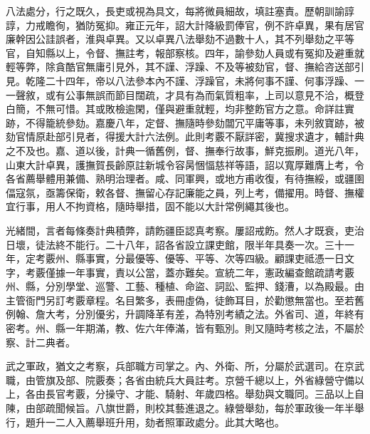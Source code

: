 \begin{pinyinscope}
八法處分，行之既久，長吏或視為具文，每將微員細故，填註塞責。歷朝訓諭諄諄，力戒瞻徇，猶防冤抑。雍正元年，詔大計降級罰俸官，例不許卓異，果有居官廉幹因公詿誤者，淮與卓異。又以卓異八法舉劾不過數十人，其不列舉劾之平等官，自知縣以上，令督、撫註考，報部察核。四年，諭參劾人員或有冤抑及避重就輕等弊，除貪酷官無庸引見外，其不謹、浮躁、不及等被劾官，督、撫給咨送部引見。乾隆二十四年，帝以八法參本內不謹、浮躁官，未將何事不謹、何事浮躁、一一聲敘，或有公事無誤而節目闊疏，才具有為而氣質粗率，上司以意見不洽，概登白簡，不無可惜。其或敗檢逾閑，僅與避重就輕，均非整飭官方之意。命詳註實跡，不得籠統參劾。嘉慶八年，定督、撫隨時參劾闒冗平庸等事，未列敘寶跡，被劾官情原赴部引見者，得援大計六法例。此則考覈不厭詳密，冀搜求遺才，輔計典之不及也。嘉、道以後，計典一循舊例，督、撫奉行故事，鮮克振刷。道光八年，山東大計卓異，護撫賀長齡原註新城令容昺悃愊慈祥等語，詔以寬厚難膺上考，令各省薦舉體用兼備、熟明治理者。咸、同軍興，或地方甫收復，有待撫綏，或疆圉偪寇氛，亟籌保衛，敕各督、撫留心存記廉能之員，列上考，備擢用。時督、撫權宜行事，用人不拘資格，隨時舉措，固不能以大計常例繩其後也。

光緒間，言者每條奏計典積弊，請飭疆臣認真考察。屢詔戒飭。然人才既衰，吏治日壞，徒法終不能行。二十八年，詔各省設立課吏館，限半年具奏一次。三十一年，定考覈州、縣事實，分最優等、優等、平等、次等四級。顧課吏祗憑一日文字，考覈僅據一年事實，責以公當，蓋亦難矣。宣統二年，憲政編查館疏請考覈州、縣，分別學堂、巡警、工藝、種植、命盜、詞訟、監押、錢漕，以為殿最。由主管衙門另訂考覈章程。名目繁多，表冊虛偽，徒飾耳目，於勸懲無當也。至若舊例翰、詹大考，分別優劣，升調降革有差，為特別考績之法。外省司、道，年終有密考。州、縣一年期滿，教、佐六年俸滿，皆有甄別。則又隨時考核之法，不屬於察、計二典者。

武之軍政，猶文之考察，兵部職方司掌之。內、外衛、所，分屬於武選司。在京武職，由管旗及部、院覈奏；各省由統兵大員註考。京營千總以上，外省綠營守備以上，各由長官考覈，分操守、才能、騎射、年歲四格。舉劾與文職同。三品以上自陳，由部疏聞候旨。八旗世爵，則校其藝進退之。綠營舉劾，每於軍政後一年半舉行，題升一二人入薦舉班升用，劾者照軍政處分。此其大略也。


\end{pinyinscope}

